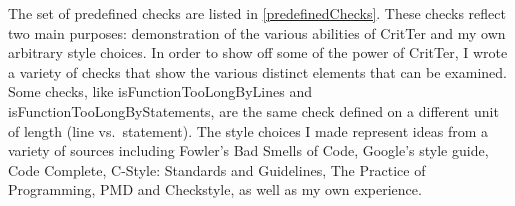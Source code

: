 \documentclass[12pt]{report}
\newcommand{\programName}{CritTer\xspace}
\begin{document}
The set of predefined checks are listed in \autoref{predefinedChecks}. These checks reflect 
two main purposes: demonstration of the various abilities of \programName and my own arbitrary style 
choices. In order to show off some of the power of \programName, I wrote a variety of checks that show 
the various distinct elements that can be examined. Some checks, like isFunctionTooLongByLines and 
isFunctionTooLongByStatements, are the same check defined on a different unit of length (line vs.\ 
statement). The style choices I made represent ideas from a variety of sources including Fowler's Bad 
Smells of Code\cite{refactoring}, Google's style guide\cite{googleStyle}, Code 
Complete\cite{code-complete}, C-Style: Standards and Guidelines\cite{standards}, The Practice of 
Programming\cite{practice-of-programming}, PMD\cite{pmd} and Checkstyle\cite{checkstyle}, as well as 
my own experience.
\end{document}
